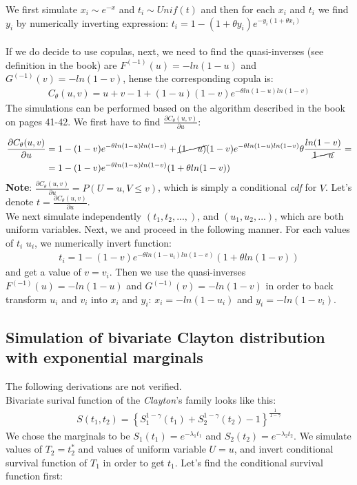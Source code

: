 \documentclass[]{article}
\begin{document}
 We first simulate $x_i \sim e^{-x}$ and $t_i \sim Unif(t)$ and then for each $x_i$ and $t_i$ we find $y_i$ by numerically inverting expression: $t_i = 1 - (1+\theta y_i)e^{-y_i(1+\theta x_i)}$ \\
~\\
If we do decide to use copulas, next, we need to find the quasi-inverses (see definition in the book) are $F^{(-1)}(u) = -ln (1-u)$ and $G^{(-1)}(v) = -ln (1-v)$, hense the corresponding copula is:
  $$
  \begin{aligned}
      C_{\theta}(u, v) = u+v-1+(1-u)(1-v)e^{-\theta ln(1-u) ln(1-v)}
  \end{aligned}
  $$
The simulations can be performed based on the algorithm described in the book on pages 41-42. We first have to find $\frac{\partial C_{\theta}(u, v)}{\partial u}$:

  $$
  \begin{aligned}
     \frac{\partial C_{\theta}(u, v)}{\partial u} &= 1-(1-v)e^{-\theta ln(1-u) ln(1-v)} + \cancel{(1-u)}(1-v)e^{-\theta ln(1-u) ln(1-v)} \theta \frac{ln(1-v)}{\cancel{1-u}} =\\
     &= 1 - (1-v)e^{-\theta ln(1-u) ln(1-v)}(1 + \theta ln(1-v))
  \end{aligned}
  $$
\textbf{Note}: $\frac{\partial C_{\theta}(u, v)}{\partial u} = P(U= u, V\leq v)$, which is simply a conditional \emph{cdf} for $V$. Let's denote $t=\frac{\partial C_{\theta}(u, v)}{\partial u}$.\\
We next simulate independently $(t_1, t_2, ..., )$, and $(u_1, u_2, ...)$, which are both uniform variables. Next, we and proceed in the following manner. For each values of $t_i$  $u_i$, we numerically invert function:
  $$
  \begin{aligned}
      t_i = 1 - (1-v)e^{-\theta ln(1-u_i) ln(1-v)}(1 + \theta ln(1-v))
  \end{aligned}
  $$
and get a value of $v=v_i$. Then we use the quasi-inverses $F^{(-1)}(u) = -ln (1-u)$ and $G^{(-1)}(v) = -ln (1-v)$ in order to back transform $u_i$ and $v_i$ into $x_i$ and $y_i$: $x_i = -ln (1-u_i)$ and $y_i = -ln (1-v_i)$.

\subsection{Simulation of bivariate Clayton distribution with exponential marginals}
The following derivations are not verified.\\
Bivariate surival function of the \emph{Clayton}'s family looks like this:
	$$
	\begin{aligned}
		 S(t_1,t_2) = \left\{  S_1^{1-\gamma}(t_1) + S_2^{1-\gamma}(t_2) - 1 \right\}^{\frac{1}{1-\gamma}}
	\end{aligned}
	$$
We chose the marginals to be $S_1(t_1) = e^{-\lambda_1t_1}$ and $S_2(t_2) = e^{-\lambda_2t_2}$. We simulate values of $T_2 = t^*_2$ and values of uniform variable $U = u$, and invert conditional survival function of $T_1$ in order to get $t_1$. Let's find the conditional survival function first:
\end{document}

